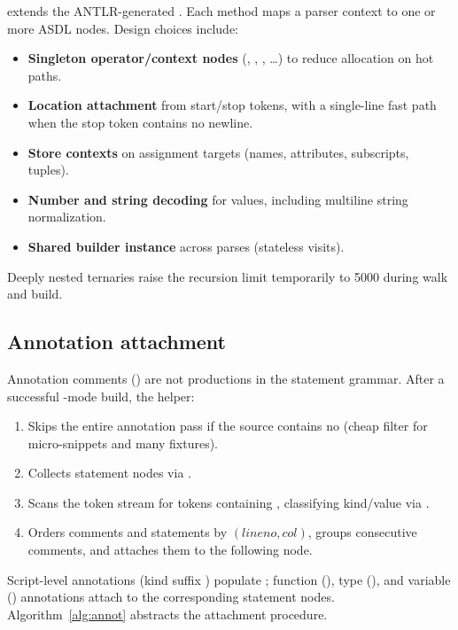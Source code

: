 \documentclass[11pt,a4paper]{article}
\begin{document}
 extends the ANTLR-generated
. Each  method maps a parser
context to one or more ASDL nodes. Design choices include:

\begin{itemize}[leftmargin=*]
  \item \textbf{Singleton operator/context nodes} (, ,
    , \ldots) to reduce allocation on hot paths.
  \item \textbf{Location attachment} from start/stop tokens, with a single-line
    fast path when the stop token contains no newline.
  \item \textbf{Store contexts} on assignment targets (names, attributes,
    subscripts, tuples).
  \item \textbf{Number and string decoding} for  values, including
    multiline string normalization.
  \item \textbf{Shared builder instance} across parses (stateless visits).
\end{itemize}

Deeply nested ternaries raise the recursion limit temporarily to 5000 during
walk and build.

\subsection{Annotation attachment}
\label{sec:annotations}

Annotation comments () are not productions in the statement
grammar. After a successful -mode build, the helper:

\begin{enumerate}[leftmargin=*]
  \item Skips the entire annotation pass if the source contains no 
    (cheap filter for micro-snippets and many fixtures).
  \item Collects statement nodes via .
  \item Scans the token stream for  tokens containing ,
    classifying kind/value via .
  \item Orders comments and statements by \((\mathit{lineno},\mathit{col})\),
    groups consecutive comments, and attaches them to the following node.
\end{enumerate}

Script-level annotations (kind suffix ) populate
; function (), type (), and variable
() annotations attach to the corresponding statement nodes.
Algorithm~\ref{alg:annot} abstracts the attachment procedure.
\end{document}
